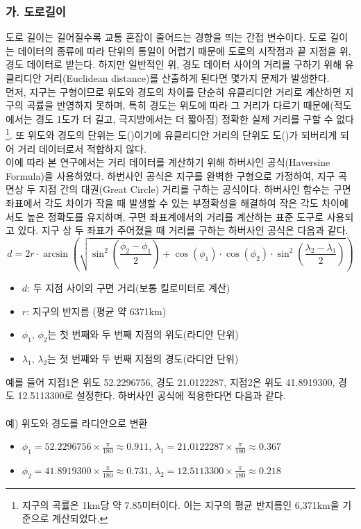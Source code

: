 \documentclass[11pt]{report}
\begin{document}
\subsubsection*{가. 도로길이}
도로 길이는 길어질수록 교통 혼잡이 줄어드는 경향을 띄는 간접 변수이다. 
도로 길이는 데이터의 종류에 따라 단위의 통일이 어렵기 때문에 도로의 시작점과 끝 지점을 위, 경도 데이터로 받는다. 
하지만 일반적인 위, 경도 데이터 사이의 거리를 구하기 위해 유클리디안 거리(Euclidean distance)를 산출하게 된다면 몇가지 문제가 발생한다. \\%
\indent 먼저, 지구는 구형이므로 위도와 경도의 차이를 단순히 유클리디안 거리로 계산하면 지구의 곡률을 반영하지 못하며, 특히 경도는 위도에 따라 그 거리가 다르기 때문에(적도에서는 경도 1도가 더 길고, 극지방에서는 더 짧아짐) 
정확한 실제 거리를 구할 수 없다 \footnote{지구의 곡률은 1km당 약 7.85미터이다. 이는 지구의 평균 반지름인 6,371km을 기준으로 계산되었다.}. 
또 위도와 경도의 단위는 도(\textdegree)이기에 유클리디안 거리의 단위도 도(\textdegree)가 되버리게 되어 거리 데이터로서 적합하지 않다. \\
\indent 이에 따라 본 연구에서는 거리 데이터를 계산하기 위해 하버사인 공식(Haversine Formula)을 사용하였다. 
하번사인 공식은 지구를 완벽한 구형으로 가정하여, 지구 곡면상 두 지점 간의 대권(Great Circle) 거리를 구하는 공식이다. 
하버사인 함수는 구면 좌표에서 각도 차이가 작을 때 발생할 수 있는 부정확성을 해결하여 작은 각도 차이에서도 높은 정확도를 유지하며, 구면 좌표계에서의 거리를 계산하는 표준 도구로 사용되고 있다. 
지구 상 두 좌표가 주어졌을 때 거리를 구하는 하버사인 공식은 다음과 같다.
$$
d = 2r \cdot \arcsin\left( \sqrt{\sin^2\left(\frac{\phi_2 - \phi_1}{2}\right) + \cos(\phi_1) \cdot \cos(\phi_2) \cdot \sin^2\left(\frac{\lambda_2 - \lambda_1}{2}\right)} \right)
$$
\begin{itemize}
	\item $d$: 두 지점 사이의 구면 거리(보통 킬로미터로 계산)
    \item $r$: 지구의 반지름 (평균 약 6371km)
    \item $\phi_1$, $\phi_2$는 첫 번째와 두 번째 지점의 위도(라디안 단위)
    \item $\lambda_1$, $\lambda_2$는 첫 번쨰와 두 번째 지점의 경도(라디안 단위)
\end{itemize}
예를 들어 지점1은 위도 52.2296756, 경도 21.0122287, 지점2은 위도 41.8919300, 경도 12.5113300로 설정한다. 
하버사인 공식에 적용한다면 다음과 같다. \\ \\
예) 위도와 경도를 라디안으로 변환
\begin{itemize}
    \item $\phi_1 = 52.2296756 \times \frac{\pi}{180} \approx 0.911$, $\lambda_1 = 21.0122287 \times \frac{\pi}{180} \approx 0.367$
    \item $\phi_2 = 41.8919300 \times \frac{\pi}{180} \approx 0.731$, $\lambda_2 = 12.5113300 \times \frac{\pi}{180} \approx 0.218$
\end{itemize}
\end{document}
